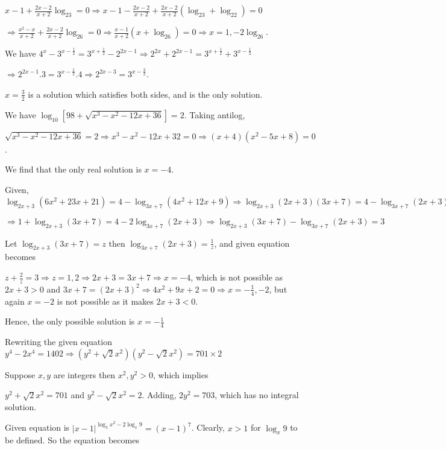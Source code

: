   $x - 1 + \frac{2x - 2}{x + 2}\log_23 = 0 \Rightarrow x - 1 - \frac{2x - 2}{x + 2} + \frac{2x - 2}{x +
  2}(\log_23 + \log_22) = 0$

  $\Rightarrow \frac{x^2 - x}{x + 2} + \frac{2x - 2}{x + 2}\log_26 = 0\Rightarrow \frac{x - 1}{x + 2}(x +
  \log_26) = 0\Rightarrow x = 1, -2\log_26$.
\item We have $4^x - 3^{x - \tfrac{1}{2}} = 3^{x + \tfrac{1}{2}} - 2^{2x - 1} \Rightarrow 2^{2x} + 2^{2x -
  1} = 3^{x + \frac{1}{2}} + 3^{x - \frac{1}{2}}$

  $\Rightarrow 2^{2x - 1}.3 = 3^{x - \frac{1}{2}}.4 \Rightarrow 2^{2x - 3} = 3^{x - \frac{3}{2}}$.

  $x = \frac{3}{2}$ is a solution which satisfies both sides, and is the only solution.
\item We have $\log_{10}[98 + \sqrt{x^3 - x^2 - 12x + 36}] = 2$. Taking antilog,

  $\sqrt{x^3 - x^2 - 12x + 36} = 2 \Rightarrow x^3 - x^2 - 12x + 32 = 0 \Rightarrow (x + 4)(x^2 - 5x + 8) =
  0$.

  We find that the only real solution is $x = -4$.
\item Given, $\log_{2x + 3}(6x^2 + 23x + 21) = 4 - \log_{3x + 7}(4x^2 + 12x + 9) \Rightarrow \log_{2x +
  3}(2x + 3)(3x + 7) = 4 - \log_{3x + 7}(2x + 3)^2$

  $\Rightarrow 1 + \log_{2x + 3}(3x + 7) = 4 - 2\log_{3x + 7}(2x + 3)\Rightarrow \log_{2x + 3}(3x + 7) -
  \log_{3x + 7}(2x + 3) = 3$

  Let $\log_{2x + 3}(3x + 7) = z$ then $\log_{3x + 7}(2x + 3) = \frac{1}{z}$, and given equation becomes

  $z + \frac{2}{z} = 3 \Rightarrow z = 1, 2 \Rightarrow 2x + 3 = 3x + 7 \Rightarrow x = -4$, which is not
  possible as $2x + 3 > 0$ and $3x + 7 = (2x + 3)^2 \Rightarrow 4x^2 + 9x + 2 = 0\Rightarrow x =
  -\frac{1}{4}, -2$, but again $x = -2$ is not possible as it makes $2x + 3 < 0$.

  Hence, the only possible solution is $x = -\frac{1}{4}$
\item Rewriting the given equation $y^4 - 2x^4 = 1402 \Rightarrow (y^2 +\sqrt{2}x^2)(y^2 - \sqrt{2}x^2) =
  701\times2$

  Suppose $x, y$ are integers then $x^2, y^2 > 0$, which implies

  $y^2 + \sqrt{2}x^2 = 701$ and $y^2 - \sqrt{2}x^2 = 2$. Adding, $2y^2 = 703$, which has no integral
  solution.
\item Given equation is $|x - 1|^{\log_3x^2 - 2\log_x9} = (x - 1)^7$. Clearly, $x > 1$ for $\log_x9$ to be
  defined. So the equation becomes

